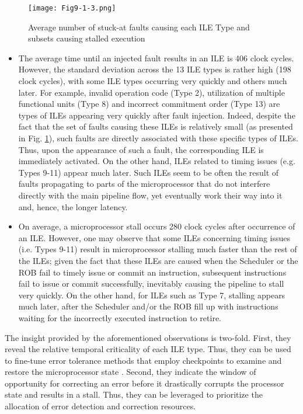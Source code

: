 \documentclass[12pt]{yalephd}
\begin{document}
\begin{figure}[!ht]
\centering
\texttt{[image: Fig9-1-3.png]}
\caption{Average number of stuck-at faults causing each ILE Type and subsets causing stalled execution}
\label{sC2results_types}
\end{figure}

\begin{itemize}
\item The average time until an injected fault results in an ILE is 406 clock cycles. However, the standard deviation across the 13 ILE types is rather high (198 clock cycles), with some ILE types occurring very quickly and others much later. For example, invalid operation code (Type 2), utilization of multiple functional units (Type 8) and incorrect commitment order (Type 13) are types of ILEs appearing very quickly after fault injection. Indeed, despite the fact that the set of faults causing these ILEs is relatively small (as presented in Fig. \ref{sC2results_types}), such faults are directly associated with these specific types of ILEs. Thus, upon the appearance of such a fault, the corresponding ILE is immediately activated. On the other hand, ILEs related to timing issues (e.g. Types 9-11) appear much later. Such ILEs seem to be often the result of faults propagating to parts of the microprocessor that do not interfere directly with the main pipeline flow, yet eventually work their way into it and, hence, the longer latency.
\item On average, a microprocessor stall occurs 280 clock cycles after occurrence of an ILE. However, one may observe that some ILEs concerning timing issues (i.e. Types 9-11) result in microprocessor stalling much faster than the rest of the ILEs; given the fact that these ILEs are caused when the Scheduler or the ROB fail to timely issue or commit an instruction, subsequent instructions fail to issue or commit successfully, inevitably causing the pipeline to stall very quickly. On the other hand, for ILEs such as Type 7, stalling appears much later, after the Scheduler and/or the ROB fill up with instructions waiting for the incorrectly executed instruction to retire. \end{itemize}

The insight provided by the aforementioned observations is two-fold. First, they reveal the relative temporal criticality of each ILE type. Thus, they can be used to fine-tune error tolerance methods that employ checkpoints to examine and restore the microprocessor state \cite{WaPa05}. Second, they indicate the window of opportunity for correcting an error before it drastically corrupts the processor state and results in a stall. Thus, they can be leveraged to prioritize the allocation of error detection and correction resources.
\end{document}
